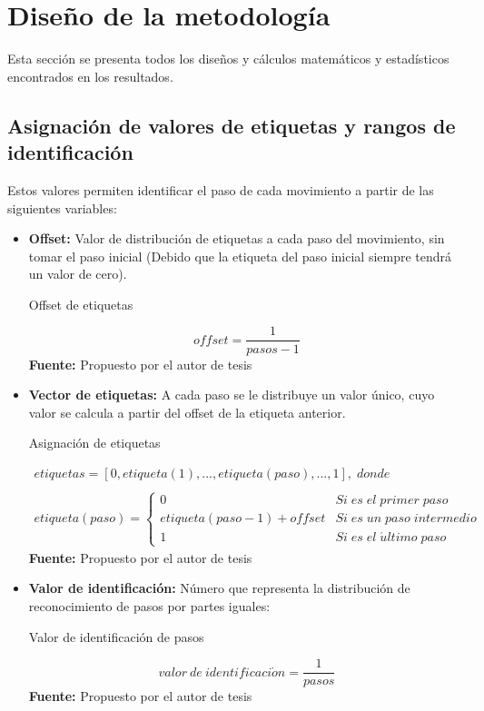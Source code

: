 \section{Dise\~no de la metodolog\'ia}\label{dis}
Esta secci\'on se presenta todos los dise\~nos y c\'alculos matem\'aticos y estad\'isticos encontrados en los resultados. 
\subsection{Asignaci\'on de valores de etiquetas y rangos de identificaci\'on}\label{dis:asig}
Estos valores permiten identificar el paso de cada movimiento a partir de las siguientes variables:
\begin{itemize}
\item \textbf{Offset:} Valor de distribuci\'on de etiquetas a cada paso del movimiento, sin tomar el paso inicial (Debido que la etiqueta del paso inicial siempre tendr\'a un valor de cero).
\begin{formula}[H]
	\centering
	\caption{Offset de etiquetas}
	\label{frm:offsetEt}
	\begin{equation}
offset = \frac{1}{pasos-1}
	\end{equation}
	\textbf{Fuente:} Propuesto por el autor de tesis
\end{formula}
\item \textbf{Vector de etiquetas:} A cada paso se le distribuye un valor \'unico, cuyo valor se calcula a partir del offset de la etiqueta anterior.
\begin{formula}[H]
	\centering
	\caption{Asignaci\'on de etiquetas}
	\label{frm:vecEtiq}
	\begin{equation}
\begin{matrix}
etiquetas=[0, etiqueta(1), ..., etiqueta(paso), ..., 1],\; donde
\\
\\
etiqueta(paso) =
\left\{\begin{matrix}
0 & Si\; es\; el\; primer \; paso
\\
etiqueta(paso-1)+offset & Si\; es\; un\; paso\; intermedio
\\ 
1 & Si\; es\; el\; \acute{u}ltimo\; paso
\end{matrix}\right.
\end{matrix}
	\end{equation}
	\textbf{Fuente:} Propuesto por el autor de tesis
\end{formula} 

\item \textbf{Valor de identificaci\'on:} N\'umero que representa la distribuci\'on de reconocimiento  de pasos por partes iguales:
\begin{formula}[H]
	\centering
	\caption{Valor de identificaci\'on de pasos}
	\label{frm:idenStep}
	\begin{equation}
valor \: de \: identificaci\acute{o}n = \frac{1}{pasos}
	\end{equation}
	\textbf{Fuente:} Propuesto por el autor de tesis
\end{formula} 


\end{itemize}
